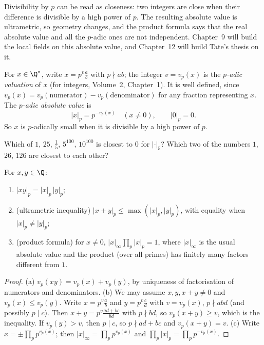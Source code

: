 Divisibility by $p$ can be read as closeness: two integers are close when their difference is divisible by a high power of $p$. The resulting absolute value is ultrametric, so geometry changes, and the product formula says that the real absolute value and all the $p$-adic ones are not independent. Chapter~9 will build the local fields on this absolute value, and Chapter~12 will build Tate's thesis on it.

For $x\in\Q^*$, write $x=p^v\frac ab$ with $p\nmid ab$; the integer $v=v_p(x)$ is the \emph{$p$-adic valuation} of $x$ (for integers, Volume~2, Chapter~1). It is well defined, since $v_p(x)=v_p(\text{numerator})-v_p(\text{denominator})$ for any fraction representing $x$. The \emph{$p$-adic absolute value} is
\[
|x|_p=p^{-v_p(x)}\quad(x\ne0),\qquad|0|_p=0.
\]
So $x$ is $p$-adically small when it is divisible by a high power of $p$.

\begin{think}
Which of $1$, $25$, $\frac15$, $5^{100}$, $10^{100}$ is closest to $0$ for $|\cdot|_5$? Which two of the numbers $1$, $26$, $126$ are closest to each other?
\end{think}

\begin{proposition}\label{prop:ultra}
For $x,y\in\Q$:
\begin{enumerate}[label=(\alph*)]
\item $|xy|_p=|x|_p\,|y|_p$;
\item (ultrametric inequality) $|x+y|_p\le\max(|x|_p,|y|_p)$, with equality when $|x|_p\ne|y|_p$;
\item (product formula) for $x\ne0$, $\displaystyle|x|_\infty\prod_p|x|_p=1$, where $|x|_\infty$ is the usual absolute value and the product (over all primes) has finitely many factors different from $1$.
\end{enumerate}
\end{proposition}
\begin{proof}
(a) $v_p(xy)=v_p(x)+v_p(y)$, by uniqueness of factorisation of numerators and denominators. (b) We may assume $x,y,x+y\ne0$ and $v_p(x)\le v_p(y)$. Write $x=p^{v}\frac ab$ and $y=p^{v}\frac cd$ with $v=v_p(x)$, $p\nmid abd$ (and possibly $p\mid c$). Then $x+y=p^v\frac{ad+bc}{bd}$ with $p\nmid bd$, so $v_p(x+y)\ge v$, which is the inequality. If $v_p(y)>v$, then $p\mid c$, so $p\nmid ad+bc$ and $v_p(x+y)=v$. (c) Write $x=\pm\prod_pp^{v_p(x)}$; then $|x|_\infty=\prod_pp^{v_p(x)}$ and $\prod_p|x|_p=\prod_pp^{-v_p(x)}$.
\end{proof}

